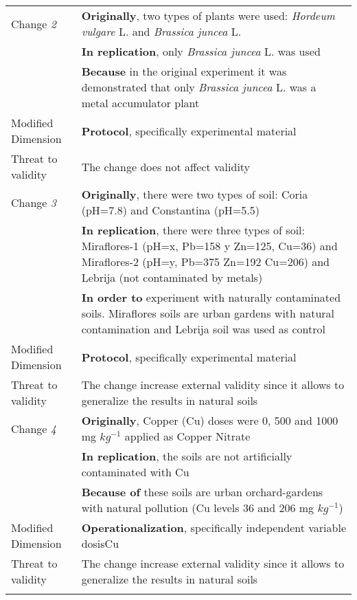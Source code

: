 \begin{table*}[h]
\begin{tabularx}{\textwidth}{
  >{\hsize=0.25\hsize}X
  >{\hsize=0.8\hsize}X}
    Change \textit{2}   & \textbf{Originally}, two types of plants were used: \emph{Hordeum vulgare} L. and \emph{Brassica juncea} L. \\& \textbf{In replication}, only \emph{Brassica juncea} L. was used \\& \textbf{Because} in the original experiment it was demonstrated that only \emph{Brassica juncea} L. was a metal accumulator plant\\  

    Modified Dimension & 
    \textbf{Protocol}, specifically experimental
    material \\   
    Threat to validity  & The change does not affect validity  \\  \hline
 
    Change \textit{3}   & \textbf{Originally}, there were two types of soil: Coria (pH=7.8) and Constantina (pH=5.5) \\& \textbf{In replication}, there were three types of soil: Miraflores-1 (pH=x, Pb=158 y Zn=125, Cu=36) and Miraflores-2 (pH=y, Pb=375 Zn=192 Cu=206) and Lebrija (not contaminated by metals) \\& \textbf{In order to}  experiment with naturally contaminated soils. Miraflores soils are urban gardens with natural contamination and Lebrija soil was used as control\\  

     Modified Dimension & 
    \textbf{Protocol}, specifically experimental
    material \\   
    Threat to validity  & The change increase external validity since it allows to generalize the results in natural soils
    \\  \hline

    Change \textit{4}   & \textbf{Originally}, Copper (Cu) doses were 0, 500 and 1000 mg $kg^{-1}$ applied as Copper Nitrate\\& \textbf{In replication}, the soils are not artificially contaminated with Cu
    \\& \textbf{Because of} these soils are urban orchard-gardens with natural pollution (Cu levels 36 and 206 mg $kg^{-1}$)
    \\  
 
    Modified Dimension & 
    \textbf{Operationalization}, specifically independent variable dosisCu\\   
    Threat to validity  & The change increase external validity since it allows to generalize the results in natural soils\\ 



	\noalign{\smallskip\smallskip}\hline
	\end{tabularx}  
\end{table*}
